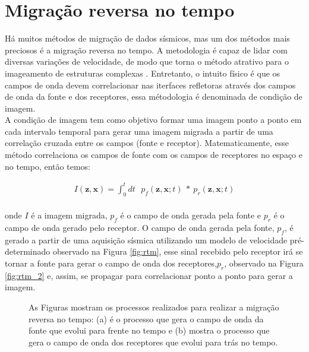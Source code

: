 \newpage
\section{Migração reversa no tempo}

Há muitos métodos de migração de dados sísmicos, mas um dos métodos mais preciosos é a migração reversa no tempo. A metodologia é capaz de lidar com diversas variações de velocidade, de modo que torna o método atrativo para o imageamento de estruturas complexas \citep{baysal_1983}. Entretanto, o intuito físico é que os campos de onda devem correlacionar nas iterfaces refletoras através dos campos de onda da fonte e dos receptores, essa métodologia é denominada de condição de imagem. \\

A condição de imagem tem como objetivo formar uma imagem ponto a ponto em cada intervalo temporal para gerar uma imagem migrada a partir de uma correlação cruzada entre os campos (fonte e receptor). Matematicamente, esse método correlaciona os campos de fonte com os campos de receptores no espaço e no tempo, então temos:

\begin{eqnarray}
 I (\mathbf{z},\mathbf{x}) = \int_{0}^{t} dt~~~ p_{f}(\mathbf{z},\mathbf{x};t)~*~ p_{r}(\mathbf{z},\mathbf{x};t)
 \label{eq:correlation_rtm}
\end{eqnarray}
\\
onde $I$ é a imagem migrada, $p_{f}$ é o campo de onda gerada pela fonte e $p_{r}$ é o campo de onda gerado pelo receptor. O campo de onda gerada pela fonte, $p_{f}$, é gerado a partir de uma aquisição sísmica utilizando um modelo de velocidade pré-determinado observado na Figura \ref{fig:rtm}, esse sinal recebido pelo receptor irá se tornar a fonte para gerar o campo de onda dos receptores,$p_{r}$, observado na Figura \ref{fig:rtm_2} e, assim, se propagar para correlacionar ponto a ponto para gerar a imagem.

\begin{figure}[h!]
\centering
{}
   
  \caption{As Figuras mostram os processos realizados para realizar a migração reversa no tempo: (a) é o processo que gera o campo de onda da fonte que evolui para frente no tempo e (b) mostra o processo que gera o campo de onda dos receptores que evolui para trás no tempo. }
\end{figure}

